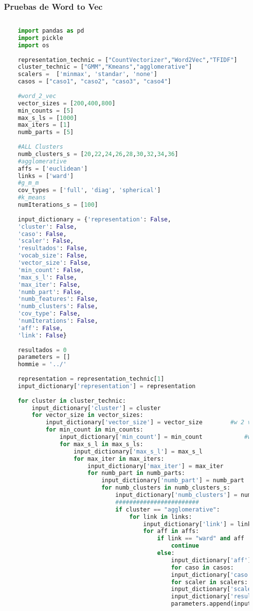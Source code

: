 \documentclass[12pt]{article}
\begin{document}
	\subsubsection*{Pruebas de Word to Vec}
	\begin{lstlisting}[language=Python, 
	caption = Rutina de pruebas Word2Vec,
		label={lst:pruebasW2V}]
	
	import pandas as pd
	import pickle
	import os
	
	representation_technic = ["CountVectorizer","Word2Vec","TFIDF"]
	cluster_technic = ["GMM","Kmeans","agglomerative"]
	scalers =  ['minmax', 'standar', 'none']
	casos = ["caso1", "caso2", "caso3", "caso4"]
	
	#word_2_vec
	vector_sizes = [200,400,800]
	min_counts = [5]
	max_s_ls = [1000]
	max_iters = [1]
	numb_parts = [5]
	
	#ALL Clusters
	numb_clusters_s = [20,22,24,26,28,30,32,34,36]
	#agglomerative
	affs = ['euclidean']
	links = ['ward']
	#g_m_m
	cov_types = ['full', 'diag', 'spherical']
	#k_means
	numIterations_s = [100]
	
	input_dictionary = {'representation': False,
	'cluster': False,
	'caso': False,
	'scaler': False,
	'resultados': False,
	'vocab_size': False,
	'vector_size': False,
	'min_count': False,
	'max_s_l': False,
	'max_iter': False,
	'numb_part': False,
	'numb_features': False,
	'numb_clusters': False,
	'cov_type': False,
	'numIterations': False,
	'aff': False,
	'link': False}
	
	resultados = 0
	parameters = []
	hommie = '../'
	
	representation = representation_technic[1]
	input_dictionary['representation'] = representation
	
	for cluster in cluster_technic:
		input_dictionary['cluster'] = cluster    
		for vector_size in vector_sizes:
			input_dictionary['vector_size'] = vector_size        #w 2 v
			for min_count in min_counts:
				input_dictionary['min_count'] = min_count            #w 2 v
				for max_s_l in max_s_ls:
					input_dictionary['max_s_l'] = max_s_l                #w 2 v
					for max_iter in max_iters:
						input_dictionary['max_iter'] = max_iter              #w 2 v
						for numb_part in numb_parts:
							input_dictionary['numb_part'] = numb_part            #w 2 v
							for numb_clusters in numb_clusters_s:
								input_dictionary['numb_clusters'] = numb_clusters
								########################
								if cluster == "agglomerative":
									for link in links:
										input_dictionary['link'] = link
										for aff in affs:
											if link == "ward" and aff != "euclidean":
												continue
											else:
												input_dictionary['aff'] = aff    
												for caso in casos:
												input_dictionary['caso'] = caso
												for scaler in scalers:
												input_dictionary['scaler'] = scaler
												input_dictionary['resultados'] = resultados
												parameters.append(input_dictionary.copy())
												

\end{lstlisting}
\end{document}
